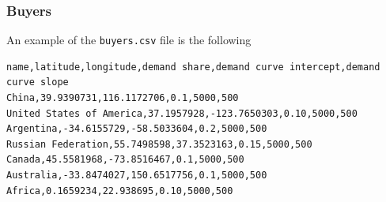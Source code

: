 \documentclass{article}
\begin{document}
\subsubsection{Buyers}
An example of the \verb+buyers.csv+ file is the following 

\begin{verbatim}
name,latitude,longitude,demand share,demand curve intercept,demand curve slope
China,39.9390731,116.1172706,0.1,5000,500
United States of America,37.1957928,-123.7650303,0.10,5000,500
Argentina,-34.6155729,-58.5033604,0.2,5000,500
Russian Federation,55.7498598,37.3523163,0.15,5000,500
Canada,45.5581968,-73.8516467,0.1,5000,500
Australia,-33.8474027,150.6517756,0.1,5000,500
Africa,0.1659234,22.938695,0.10,5000,500

\end{verbatim}
\end{document}

